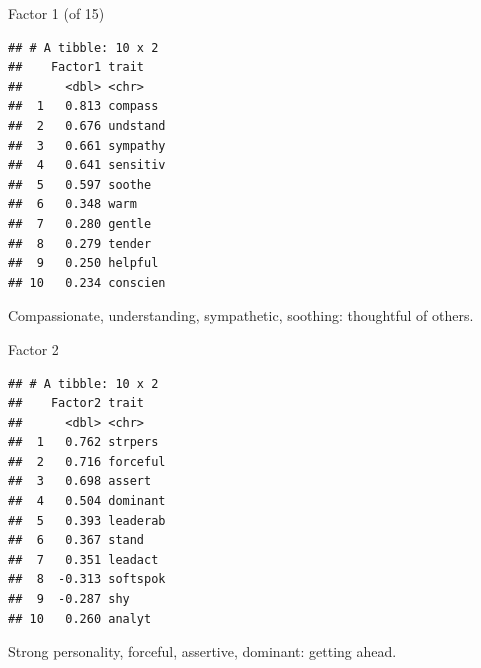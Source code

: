 \documentclass[
  ignorenonframetext,
]{beamer}
\newenvironment{Shaded}{\begin{snugshade}}{\end{snugshade}}
\newcommand{\DecValTok}[1]{\textcolor[rgb]{0.00,0.00,0.81}{#1}}
\newcommand{\KeywordTok}[1]{\textcolor[rgb]{0.13,0.29,0.53}{\textbf{#1}}}
\newcommand{\NormalTok}[1]{#1}
\newcommand{\OperatorTok}[1]{\textcolor[rgb]{0.81,0.36,0.00}{\textbf{#1}}}
\newcommand{\StringTok}[1]{\textcolor[rgb]{0.31,0.60,0.02}{#1}}
\begin{document}
\begin{frame}[fragile]{Factor 1 (of 15)}
\protect\hypertarget{factor-1-of-15}{}

\footnotesize

\begin{Shaded}
\end{Shaded}

\begin{verbatim}
## # A tibble: 10 x 2
##    Factor1 trait   
##      <dbl> <chr>   
##  1   0.813 compass 
##  2   0.676 undstand
##  3   0.661 sympathy
##  4   0.641 sensitiv
##  5   0.597 soothe  
##  6   0.348 warm    
##  7   0.280 gentle  
##  8   0.279 tender  
##  9   0.250 helpful 
## 10   0.234 conscien
\end{verbatim}

\normalsize

Compassionate, understanding, sympathetic, soothing: thoughtful of
others.

\end{frame}

\begin{frame}[fragile]{Factor 2}
\protect\hypertarget{factor-2}{}

\footnotesize

\begin{Shaded}
\end{Shaded}

\begin{verbatim}
## # A tibble: 10 x 2
##    Factor2 trait   
##      <dbl> <chr>   
##  1   0.762 strpers 
##  2   0.716 forceful
##  3   0.698 assert  
##  4   0.504 dominant
##  5   0.393 leaderab
##  6   0.367 stand   
##  7   0.351 leadact 
##  8  -0.313 softspok
##  9  -0.287 shy     
## 10   0.260 analyt
\end{verbatim}

\normalsize

Strong personality, forceful, assertive, dominant: getting ahead.

\end{frame}
\end{document}
